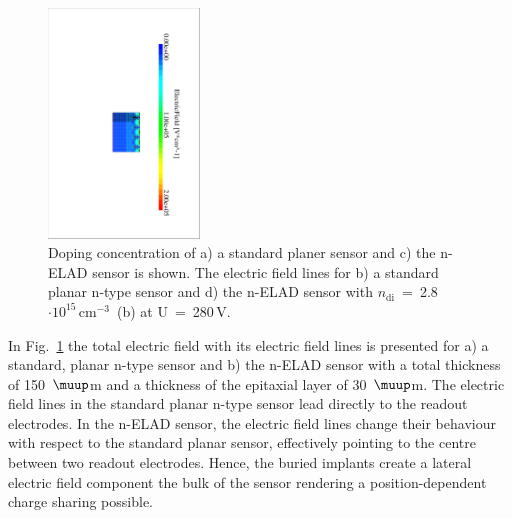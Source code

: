 \documentclass[a4paper,11pt]{article}
\begin{document}
\begin{figure}[t!]
   \hfill 
  \includegraphics[trim=0.cm -9cm 0.cm 0.cm, height=6.1cm]{figures/eps/nelad_ef_leg.pdf}
   \hfill 
  \caption{
Doping concentration of a) a standard planer sensor and c) the n-ELAD sensor is shown. 
The electric field lines for b) a standard planar n-type sensor and d) the n-ELAD sensor with $n\mathrm{_{di}}$~=~2.8$\mathrm{\cdot10^{15}\,cm^{-3}}$~(b) at U~=~280\,V.
}
  \label{fig:el}
\end{figure}

In Fig.~\ref{fig:el} the total electric field with its electric field lines is presented for a) a standard, planar n-type sensor and b) the n-ELAD sensor
 with a total thickness of 150~$\muup$m and a thickness of the epitaxial layer of 30~$\muup$m.
The electric field lines in the standard planar n-type sensor lead directly to the readout electrodes. 
In the n-ELAD sensor, the electric field lines change their behaviour with respect to the standard planar sensor, effectively pointing to the centre between two readout electrodes. 
Hence, the buried implants create a lateral electric field component the bulk of the sensor rendering a position-dependent charge sharing possible.
\end{document}
